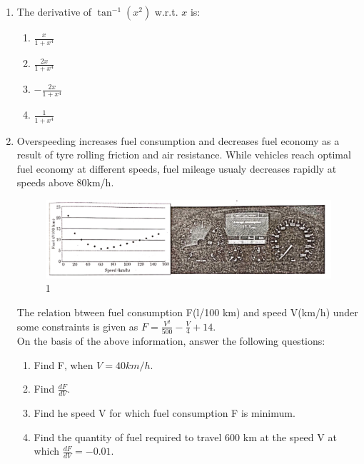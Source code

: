 \begin{enumerate}
	\item The derivative of $\tan^{-1}(x^{2})$ w.r.t. $x$ is:
		\begin{enumerate}
			\item $\frac{x}{1 + x^{4}}$
			\item $\frac{2x}{1 +x^{4}}$
			\item $-\frac{2x}{1 + x^{4}}$
			\item $\frac{1}{1+x^{4}}$
		\end{enumerate}
	\item Overspeeding increases fuel consumption and decreases fuel economy as a result of tyre rolling friction and air resistance. While vehicles reach optimal fuel economy at different speeds, fuel mileage usualy decreases rapidly at speeds above 80km/h. \\
		\begin{figure}[h]
			\centering
			      \includegraphics[width=120mm]{figs/Speed.jpg}
			      \caption{1}
			\label{Figure}
		\end{figure}
		The relation btween fuel consumption F(l/100 km) and speed V(km/h) under some constraints is given as $F = \frac{V^{2}}{500} - \frac{V}{4} +14$. \\
		On the basis of the above information, answer the following questions:
		\begin{enumerate}[label=(\roman*)]
			\item  Find F, when $V = 40km/h$.
			\item  Find $\frac{dF}{dV}$.
			\item  Find he speed V for which fuel consumption F is minimum.
			\item  Find the quantity of fuel required to travel 600 km at the speed V at which $\frac{dF}{dV} = -0.01$.
		\end{enumerate}
\end{enumerate}
